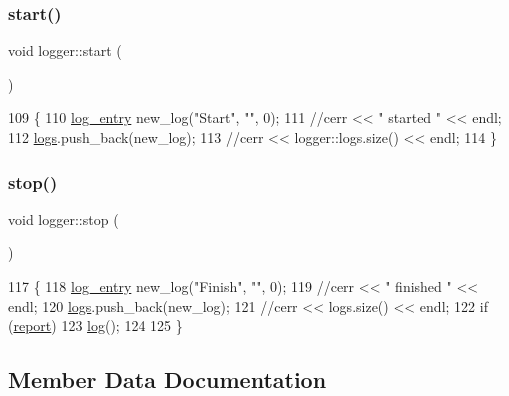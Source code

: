 \mbox{\label{classlogger_afba86118a3bb044060be8309b3fa755a}} 
\subsubsection{\texorpdfstring{start()}{start()}}
{\footnotesize\ttfamily void logger\+::start (\begin{DoxyParamCaption}{ }\end{DoxyParamCaption})\hspace{0.3cm}{\ttfamily [static]}}


\begin{DoxyCode}
109                   \{
110   \hyperlink{classlog__entry}{log\_entry} new\_log(\textcolor{stringliteral}{"Start"}, \textcolor{stringliteral}{""}, 0);
111   \textcolor{comment}{//cerr << " started " << endl;}
112   \hyperlink{classlogger_a46e89697a97bc41a90ec78763bfe4d39}{logs}.push\_back(new\_log);
113   \textcolor{comment}{//cerr << logger::logs.size() << endl;}
114 \}
\end{DoxyCode}
\mbox{\label{classlogger_abb856642f4e62c7a4a11cc4a2d963010}} 
\subsubsection{\texorpdfstring{stop()}{stop()}}
{\footnotesize\ttfamily void logger\+::stop (\begin{DoxyParamCaption}{ }\end{DoxyParamCaption})\hspace{0.3cm}{\ttfamily [static]}}


\begin{DoxyCode}
117                  \{
118   \hyperlink{classlog__entry}{log\_entry} new\_log(\textcolor{stringliteral}{"Finish"}, \textcolor{stringliteral}{""}, 0);
119   \textcolor{comment}{//cerr << " finished " << endl;}
120   \hyperlink{classlogger_a46e89697a97bc41a90ec78763bfe4d39}{logs}.push\_back(new\_log);
121   \textcolor{comment}{//cerr << logs.size() << endl;}
122   \textcolor{keywordflow}{if} (\hyperlink{classlogger_adbcc380b0ef53e23125f91e1c8f13f4e}{report})
123     \hyperlink{classlogger_ab518e6d927694bb7329e933fa75c27bf}{log}();
124 
125 \}
\end{DoxyCode}


\subsection{Member Data Documentation}
\mbox{\label{classlogger_a9d29b49bd318a719a8e85b59eac54fe0}} 
